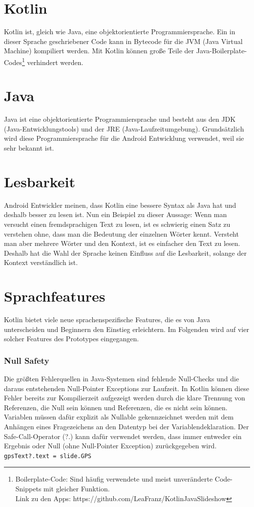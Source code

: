 \documentclass{sigchi-ext}
\begin{document}
\section{Kotlin}
Kotlin ist, gleich wie Java, eine objektorientierte Programmiersprache. Ein in dieser Sprache geschriebener Code kann 
in Bytecode für die JVM (Java Virtual Machine) kompiliert werden. Mit Kotlin können große Teile der
Java-Boilerplate-Codes\footnote{Boilerplate-Code: Sind häufig verwendete und meist unveränderte Code-Snippets mit
gleicher Funktion. \\Link zu den Apps: https://github.com/LeaFranz/KotlinJavaSlideshow} verhindert werden.\cite{boilerplate}

\section{Java}
Java ist eine objektorientierte Programmiersprache und besteht aus den JDK (Java-Entwicklungstools) und der JRE
 (Java-Laufzeitumgebung). Grundsätzlich wird diese Programmiersprache für die Android Entwicklung 
 verwendet, weil sie sehr bekannt ist. \cite{banerjee2018comparative}

\section{Lesbarkeit}
Android Entwickler meinen, dass Kotlin eine bessere Syntax als Java hat und deshalb besser
zu lesen ist. Nun ein Beispiel zu dieser Aussage: Wenn man versucht einen fremdsprachigen
Text zu lesen, ist es schwierig einen Satz zu verstehen ohne, dass man die Bedeutung der
einzelnen Wörter kennt. Versteht man aber mehrere Wörter und den Kontext, ist es einfacher den
Text zu lesen. Deshalb hat die Wahl der Sprache keinen Einfluss auf die Lesbarkeit, solange
der Kontext verständlich ist.

\section{Sprachfeatures}
Kotlin bietet viele neue sprachenspezifische Features, die es von Java unterscheiden und Beginnern den Einstieg erleichtern. Im Folgenden wird auf vier solcher Features des Prototypes eingegangen.

\subsubsection{Null Safety}
Die größten Fehlerquellen in Java-Systemen sind fehlende Null-Checks und die daraus entstehenden Null-Pointer Exceptions zur Laufzeit. In Kotlin können diese Fehler bereits zur Kompilierzeit aufgezeigt werden durch die klare Trennung von Referenzen, die Null sein können und Referenzen, die es nicht sein können. Variablen müssen dafür explizit als Nullable gekennzeichnet werden mit dem Anhängen eines Fragezeichens an den Datentyp bei der Variablendeklaration. Der Safe-Call-Operator (?.) kann dafür verwendet werden, dass immer entweder ein Ergebnis oder Null (ohne Null-Pointer Exception) zurückgegeben wird. \cite{moskala2017android} \\ \texttt{gpsText?.text = slide.GPS} \\ 
\end{document}
